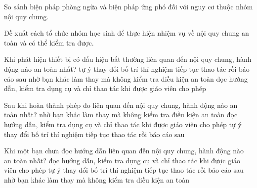 \begin{bt}
So sánh biện pháp phòng ngừa và biện pháp ứng phó đối với nguy cơ thuộc nhóm nội quy chung.
\end{bt}

\begin{bt}
Đề xuất cách tổ chức nhóm học sinh để thực hiện nhiệm vụ về nội quy chung an toàn và có thể kiểm tra được.
\end{bt}

\begin{ex}
Khi phát hiện thiết bị có dấu hiệu bất thường liên quan đến nội quy chung, hành động nào an toàn nhất?
\choice
{tự ý thay đổi bố trí thí nghiệm}
{tiếp tục thao tác rồi báo cáo sau}
{nhờ bạn khác làm thay mà không kiểm tra điều kiện an toàn}
{\True đọc hướng dẫn, kiểm tra dụng cụ và chỉ thao tác khi được giáo viên cho phép}
\end{ex}

\begin{ex}
Sau khi hoàn thành phép đo liên quan đến nội quy chung, hành động nào an toàn nhất?
\choice
{nhờ bạn khác làm thay mà không kiểm tra điều kiện an toàn}
{\True đọc hướng dẫn, kiểm tra dụng cụ và chỉ thao tác khi được giáo viên cho phép}
{tự ý thay đổi bố trí thí nghiệm}
{tiếp tục thao tác rồi báo cáo sau}
\end{ex}

\begin{ex}
Khi một bạn chưa đọc hướng dẫn liên quan đến nội quy chung, hành động nào an toàn nhất?
\choice
{\True đọc hướng dẫn, kiểm tra dụng cụ và chỉ thao tác khi được giáo viên cho phép}
{tự ý thay đổi bố trí thí nghiệm}
{tiếp tục thao tác rồi báo cáo sau}
{nhờ bạn khác làm thay mà không kiểm tra điều kiện an toàn}
\end{ex}

